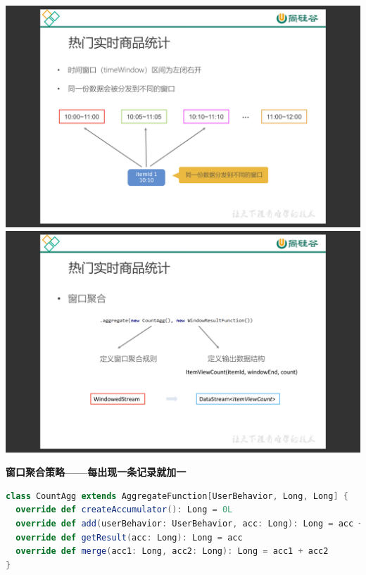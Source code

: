 \documentclass[oneside]{ctexbook}
\begin{document}
\noindent \includegraphics[width=\textwidth]{电商用户行为数据分析4.png}
\noindent \includegraphics[width=\textwidth]{电商用户行为数据分析5.png}

\textbf{窗口聚合策略——每出现一条记录就加一}

\begin{lstlisting}[language=scala]
class CountAgg extends AggregateFunction[UserBehavior, Long, Long] {
  override def createAccumulator(): Long = 0L
  override def add(userBehavior: UserBehavior, acc: Long): Long = acc + 1
  override def getResult(acc: Long): Long = acc
  override def merge(acc1: Long, acc2: Long): Long = acc1 + acc2
}
\end{lstlisting}
\end{document}
